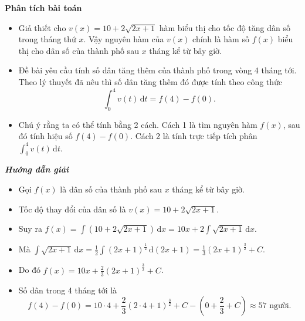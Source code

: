 \documentclass[12pt,a4paper]{article}
\newcommand{\dd}{\,\mathrm{d}}
\newcommand{\analysis}{\noindent\raisebox{0.15ex}{\rule{1.6ex}{1.6ex}}\hspace{4pt}\textbf{Phân tích bài toán}\par}
\newcommand{\solution}{\begin{center}\textbf{\textit{Hướng dẫn giải}}\end{center}\par}
\begin{document}
\begin{analysisbox}
\analysis
\begin{itemize}
\item Giả thiết cho $v(x)=10+2\sqrt{2x+1}$ hàm biểu thị cho tốc độ tăng dân số trong tháng thứ $x$. Vậy nguyên hàm của $v(x)$ chính là hàm số $f(x)$ biểu thị cho dân số của thành phố sau $x$ tháng kể từ bây giờ.
\item Đề bài yêu cầu tính số dân tăng thêm của thành phố trong vòng 4 tháng tới. Theo lý thuyết đã nêu thì số dân tăng thêm đó được tính theo công thức
\[
\int_0^4v(t)\dd t=f(4)-f(0).
\]
\item Chú ý rằng ta có thể tính bằng 2 cách. Cách 1 là tìm nguyên hàm $f(x)$, sau đó tính hiệu số $f(4)-f(0)$. Cách 2 là tính trực tiếp tích phân $\displaystyle\int_0^4v(t)\dd t$.
\end{itemize}
\end{analysisbox}

\solution
\begin{itemize}
\item Gọi $f(x)$ là dân số của thành phố sau $x$ tháng kể từ bây giờ.
\item Tốc độ thay đổi của dân số là $v(x)=10+2\sqrt{2x+1}$.
\item Suy ra $f(x)=\int\left(10+2\sqrt{2x+1}\right)\dd x=10x+2\int\sqrt{2x+1}\dd x$.
\item Mà $\int\sqrt{2x+1}\dd x=\frac12\int(2x+1)^{\frac{1}{2}}\dd(2x+1)=\frac13(2x+1)^{\frac{3}{2}}+C$.
\item Do đó $f(x)=10x+\frac23(2x+1)^{\frac{3}{2}}+C$.
\item Số dân trong 4 tháng tới là
\[
f(4)-f(0)=10\cdot4+\frac23(2\cdot4+1)^{\frac{3}{2}}+C-\left(0+\frac23+C\right)\approx57\text{ người}.
\]
\end{itemize}
\end{document}

